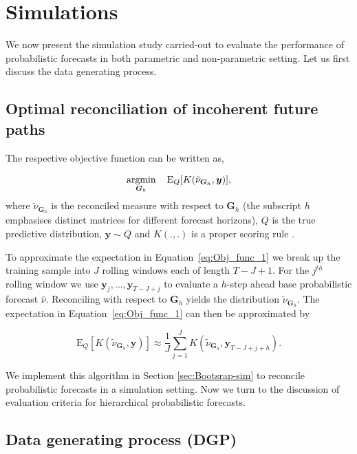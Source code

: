 \documentclass[12pt]{article}
\def\E{\text{E}}
\theoremstyle{definition}
\begin{document}
\section{Simulations}

We now present the simulation study carried-out to evaluate the performance of probabilistic forecasts in both parametric and non-parametric setting. Let us first discuss the data generating process.

\subsection{Optimal reconciliation of incoherent future paths}\label{subsec:Optimal_recon}

{\color{blue} The respective objective function can be written as,

\begin{equation} \label{eq:Obj_func_1}
\operatornamewithlimits{argmin}_{\bm{G}_h} \quad \E_{Q}[K(\tilde{\nu}_{\bm{G}_h}, \bm{y})],
\end{equation}
where $\tilde{\nu}_{\bm{G}_h}$ is the reconciled measure with respect to $\bm{G}_h$ (the subscript $h$ emphasises distinct matrices for different forecast horizons), $Q$ is the true predictive distribution, $\bm{y}\sim Q$ and $K(.,.)$ is a proper scoring rule \citep[see][and references therein]{Gneiting2007,Gneiting2014}.

To approximate the expectation in Equation~\eqref{eq:Obj_func_1} we break up the training sample into $J$ rolling windows each of length $T-J+1$.  For the $j^{th}$ rolling window we use $\bm{y}_{j},\ldots,\bm{y}_{T-J+j}$ to evaluate a $h$-step ahead base probabilistic forecast $\hat{\nu}$.  Reconciling with respect to $\bm{G}_h$ yields the distribution $\tilde{\nu}_{\bm{G}_h}$.  The expectation in Equation~\eqref{eq:Obj_func_1} can then be approximated by

\begin{equation} \label{eq:Obj_func_apprx} \E_{Q}[K(\tilde{\nu}_{\bm{G}_h}, \bm{y})]\approx\frac{1}{J}\sum_{j=1}^{J}K(\tilde{\nu}_{\bm{G}_h},\bm{y}_{T-J+j+h}).\nonumber
\end{equation}

We implement this algorithm in Section \ref{sec:Bootsrap-sim} to reconcile probabilistic forecasts in a simulation setting. Now we turn to the discussion of evaluation criteria for hierarchical probabilistic forecasts.}


\subsection{Data generating process (DGP)} \label{subsec:DGP}
\end{document}
